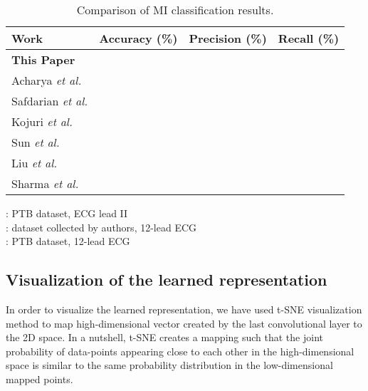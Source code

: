 \documentclass[10pt, conference, compsocconf]{IEEEtran}
\begin{document}
\begin{table}[!t]
\renewcommand{\arraystretch}{1.3}
\caption{Comparison of MI classification results.}
\label{tab:results_mi}
\centering
\begin{tabular}{lccc}
\hline
\textbf{Work}  & \textbf{Accuracy (\%)} & \textbf{Precision (\%)} & \textbf{Recall (\%)}\\
\hline
\hline
\textbf{This Paper\footnotemark[1]} & \bm{} & \bm{} & \bm{} \\

Acharya \textit{et al.} \cite{acharya2017application}\footnotemark[1] &  &  &  \\ 

Safdarian \textit{et al.} \cite{safdarian2014new}\footnotemark[1] &  &  &  \\ 

Kojuri \textit{et al.} \cite{kojuri2015prediction}\footnotemark[2] &  &  &  \\ 

Sun \textit{et al.} \cite{sun2012ecg}\footnotemark[3] &  &  &  \\ 

Liu \textit{et al.} \cite{liu2015novel}\footnotemark[3] &  &  &  \\ 

Sharma \textit{et al.} \cite{sharma2015multiscale}\footnotemark[3] &  &  &  \\ 

\hline
\end{tabular}
\begin{flushleft}
\footnotemark[1]: PTB dataset, ECG lead II \\
\footnotemark[2]: dataset collected by authors, 12-lead ECG \\
\footnotemark[3]: PTB dataset, 12-lead ECG \\

\end{flushleft}

\end{table}

\subsection{Visualization of the learned representation}





In order to visualize the learned representation, we have used t-SNE visualization method \cite{maaten2008visualizing} to map high-dimensional vector created by the last convolutional layer to the 2D space. In a nutshell, t-SNE creates a mapping such that the joint probability of data-points appearing close to each other in the high-dimensional space is similar to the same probability distribution in the low-dimensional mapped points. 
\end{document}

